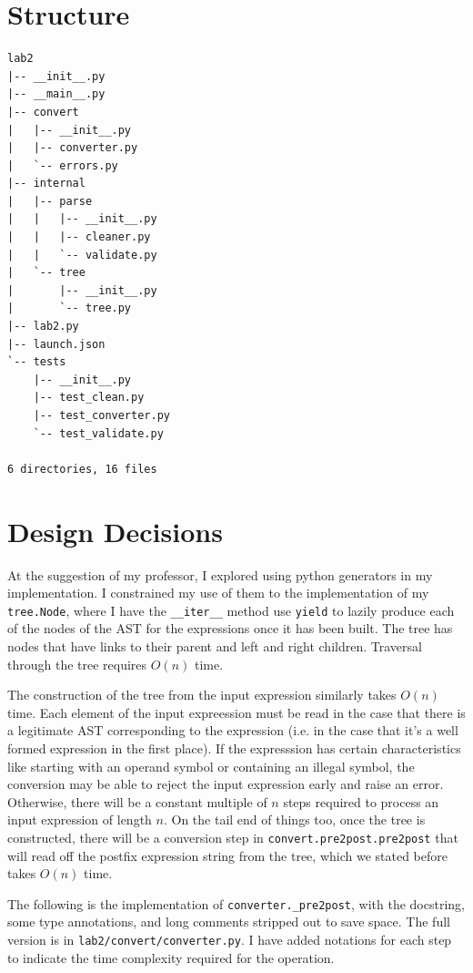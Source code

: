 \documentclass[10pt,letterpaper,final]{report}
\begin{document}
\clearpage\pagebreak

\section{Structure}\label{sec:structure}

\begin{verbatim}
lab2
|-- __init__.py
|-- __main__.py
|-- convert
|   |-- __init__.py
|   |-- converter.py
|   `-- errors.py
|-- internal
|   |-- parse
|   |   |-- __init__.py
|   |   |-- cleaner.py
|   |   `-- validate.py
|   `-- tree
|       |-- __init__.py
|       `-- tree.py
|-- lab2.py
|-- launch.json
`-- tests
    |-- __init__.py
    |-- test_clean.py
    |-- test_converter.py
    `-- test_validate.py

6 directories, 16 files
\end{verbatim}

\section{Design Decisions}

At the suggestion of my professor, I explored using python generators in my implementation. I constrained my use of them to the implementation of my \texttt{tree.Node}, where I have the \texttt{__iter__} method use \texttt{yield} to lazily produce each of the nodes of the AST for the expressions once it has been built. The tree has nodes that have links to their parent and left and right children. Traversal through the tree requires $O(n)$ time.

The construction of the tree from the input expression similarly takes $O(n)$ time. Each element of the input expreession must be read in the case that there is a legitimate AST corresponding to the expression (i.e. in the case that it's a well formed expression in the first place). If the expresssion has certain characteristics like starting with an operand symbol or containing an illegal symbol, the conversion may be able to reject the input expression early and raise an error. Otherwise, there will be a constant multiple of $n$ steps required to process an input expression of length $n$. On the tail end of things too, once the tree is constructed, there will be a conversion step in \texttt{convert.pre2post.pre2post} that will read off the postfix expression string from the tree, which we stated before takes $O(n)$ time.

The following is the implementation of \texttt{converter._pre2post}, with the docstring, some type annotations, and long comments stripped out to save space. The full version is in \texttt{lab2/convert/converter.py}. I have added notations for each step to indicate the time complexity required for the operation.
\end{document}
